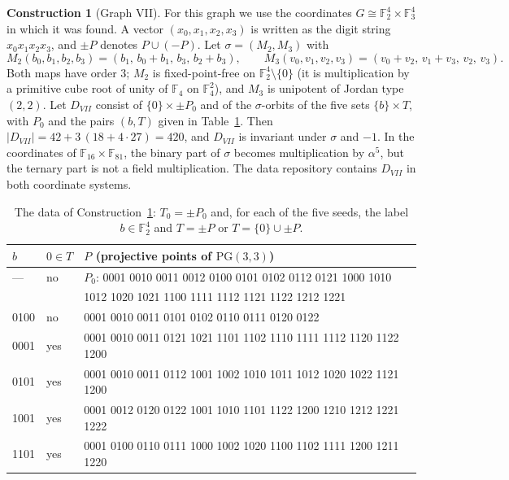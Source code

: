\documentclass[11pt]{amsart}
\theoremstyle{definition}
\newtheorem{construction}[theorem]{Construction}
\newcommand{\F}{\mathbb{F}}
\begin{document}
\begin{construction}[Graph VII]\label{con:VII}
For this graph we use the coordinates $G\cong\F_2^4\times\F_3^4$ in which it was found. A vector $(x_0,x_1,x_2,x_3)$ is written as the digit string $x_0x_1x_2x_3$, and $\pm P$ denotes $P\cup(-P)$. Let $\sigma=(M_2,M_3)$ with
\[
M_2(b_0,b_1,b_2,b_3)=(b_1,\,b_0+b_1,\,b_3,\,b_2+b_3),\qquad M_3(v_0,v_1,v_2,v_3)=(v_0+v_2,\,v_1+v_3,\,v_2,\,v_3).
\]
Both maps have order $3$; $M_2$ is fixed-point-free on $\F_2^4\setminus\{0\}$ (it is multiplication by a primitive cube root of unity of $\F_4$ on $\F_4^2$), and $M_3$ is unipotent of Jordan type $(2,2)$. Let $D_{VII}$ consist of $\{0\}\times\pm P_0$ and of the $\sigma$-orbits of the five sets $\{b\}\times T$, with $P_0$ and the pairs $(b,T)$ given in Table~\ref{tab:VII}. Then $|D_{VII}|=42+3\,(18+4\cdot27)=420$, and $D_{VII}$ is invariant under $\sigma$ and $-1$. In the coordinates of $\F_{16}\times\F_{81}$, the binary part of $\sigma$ becomes multiplication by $\alpha^5$, but the ternary part is not a field multiplication. The data repository contains $D_{VII}$ in both coordinate systems.
\end{construction}

\begin{table}[ht]
\centering\small
\caption{The data of Construction~\ref{con:VII}: $T_0=\pm P_0$ and, for each of the five seeds, the label $b\in\F_2^4$ and $T=\pm P$ or $T=\{0\}\cup\pm P$.}\label{tab:VII}
\begin{tabular}{lll}
\toprule
$b$ & $0\in T$ & $P$ (projective points of $\mathrm{PG}(3,3)$)\\
\midrule
--- & no & $P_0$: 0001 0010 0011 0012 0100 0101 0102 0112 0121 1000 1010\\
& & \phantom{$P_0$: }1012 1020 1021 1100 1111 1112 1121 1122 1212 1221\\
0100 & no & 0001 0010 0011 0101 0102 0110 0111 0120 0122\\
0001 & yes & 0001 0010 0011 0121 1021 1101 1102 1110 1111 1112 1120 1122 1200\\
0101 & yes & 0001 0010 0011 0112 1001 1002 1010 1011 1012 1020 1022 1121 1200\\
1001 & yes & 0001 0012 0120 0122 1001 1010 1101 1122 1200 1210 1212 1221 1222\\
1101 & yes & 0001 0100 0110 0111 1000 1002 1020 1100 1102 1111 1200 1211 1220\\
\bottomrule
\end{tabular}
\end{table}
\end{document}

